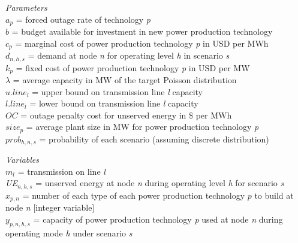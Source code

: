 \documentclass[10pt]{amsart}
\begin{document}
\begin{flushleft}
\textit{Parameters} \\
$a_{p}$ = forced outage rate of technology \textit{p} \\
$b$ = budget available for investment in new power production technology \\
$c_{p}$ = marginal cost of power production technology \textit{p} in USD per MWh \\
$d_{n,h,s}$ = demand at node \textit{n} for operating level \textit{h} in scenario \textit{s} \\
$k_{p}$ = fixed cost of power production technology \textit{p} in USD per MW \\
$\lambda$ = average capacity in MW of the target Poisson distribution \\ 
$u.line_{l}$ = upper bound on transmission line \textit{l} capacity \\
$l.line_{l}$ = lower bound on transmission line  \textit{l} capacity \\
$OC$ = outage penalty cost for unserved energy in \$ per MWh \\
$size_{p}$ = average plant size in MW for power production technology \textit{p} \\
$prob_{h,n,s}$ = probability of each scenario (assuming discrete distribution) \\
\end{flushleft}

\begin{flushleft}
\textit{Variables} \\
$m_{l}$ = transmission on line \textit{l} \\
\textit{UE}$_{n,h,s}$ = unserved energy at node \textit{n} during operating level \textit{h} for scenario \textit{s} \\
$x_{p,n}$ = number of each type of each power production technology $\textit{p}$ to build at node \textit{n} [integer variable] \\
$y_{p,n,h,s}$ = capacity of power production technology \textit{p} used at node \textit{n} during operating mode \textit{h} under scenario \textit{s} \\
\end{flushleft}
\end{document}

